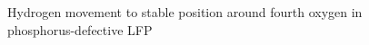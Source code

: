 \begin{figure}[h!]
\begin{minipage}[h]{0.5\linewidth}
\end{minipage}
\hfill
\begin{minipage}[h]{0.5\linewidth}
\end{minipage}
\caption{Hydrogen movement to stable position around fourth oxygen in phosphorus-defective LFP}
\label{O4Finitialfinal}
\end{figure}

